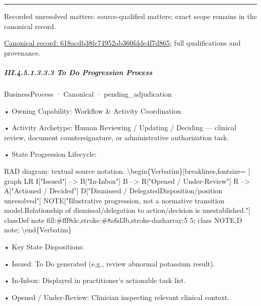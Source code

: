 \medskip\hrule\medskip

{\small Recorded unresolved matters: source-qualified matters; exact scope remains in the canonical record.}\par
{\footnotesize \href{../../../../../../../continuum/business/business-process/618acdb38fc74952ab360fdde4f7d865.md}{Canonical record: 618acdb38fc74952ab360fdde4f7d865}; full qualifications and provenance.}\par
\subparagraph*{III.4.5.1.3.3.3 To Do Progression Process}
\label{navigation:III.4.5.1.3.3.3}

\label{element:c5e4c3076b094c98a628179b91ae03d0}
{\small BusinessProcess · Canonical · pending\_adjudication}\par

•
Owning Capability: Workflow \& Activity Coordination



•
Activity Archetype: Human Reviewing / Updating / Deciding — clinical review, document countersignature, or administrative authorization task.



•
State Progression Lifecycle:



RAD diagram: textual source notation.
\textbackslash{}begin\{Verbatim\}[breaklines,fontsize=
]
graph LR
    I["Issued"] --> B["In-Inbox"]
    B --> R["Opened / Under-Review"]
    R --> A["Actioned / Decided"]
    D["Dismissed / Delegated\newline{}Disposition/position unresolved"]
    NOTE["Illustrative progression, not a normative transition model.\newline{}Relationship of dismissal/delegation to action/decision is unestablished."]
    classDef note fill:\#fff8dc,stroke:\#8a6d3b,stroke-dasharray:5 5;
    class NOTE,D note;
\textbackslash{}end\{Verbatim\}



•
Key State Dispositions:



•
Issued: To Do generated (e.g., review abnormal potassium result).



•
In-Inbox: Displayed in practitioner's actionable task list.



•
Opened / Under-Review: Clinician inspecting relevant clinical context.



